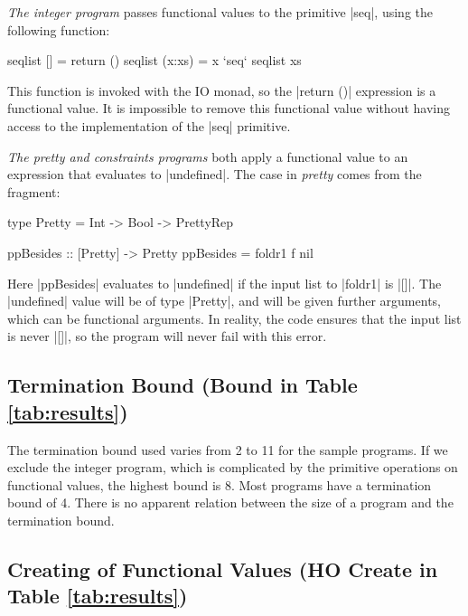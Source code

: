 \begin{example}
\textit{The integer program} passes functional values to the primitive |seq|, using the following function:

\begin{code}
seqlist [] = return ()
seqlist (x:xs) = x `seq` seqlist xs
\end{code}

This function is invoked with the IO monad, so the |return ()| expression is a functional value. It is impossible to remove this functional value without having access to the implementation of the |seq| primitive.
\end{example}

\begin{example}
\textit{The pretty and constraints programs} both apply a functional value to an expression that evaluates to |undefined|. The case in \textit{pretty} comes from the fragment:

\begin{comment}
\begin{code}
data PrettyRep = PrettyRep
\end{code}
\end{comment}
\begin{code}
type Pretty = Int -> Bool -> PrettyRep

ppBesides :: [Pretty] -> Pretty
ppBesides = foldr1 f nil
\end{code}

Here |ppBesides| evaluates to |undefined| if the input list to |foldr1| is |[]|. The |undefined| value will be of type |Pretty|, and will be given further arguments, which can be functional arguments. In reality, the code ensures that the input list is never |[]|, so the program will never fail with this error.
\end{example}

\subsection{Termination Bound (Bound in Table \ref{tab:results})}

The termination bound used varies from 2 to 11 for the sample programs. If we exclude the integer program, which is complicated by the primitive operations on functional values, the highest bound is 8. Most programs have a termination bound of 4. There is no apparent relation between the size of a program and the termination bound.

\subsection{Creating of Functional Values (HO Create in Table \ref{tab:results})}


